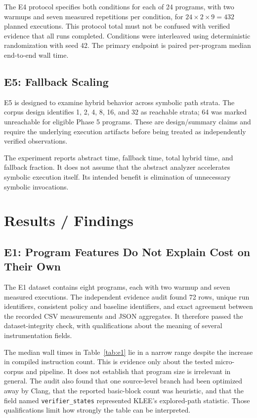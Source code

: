 \documentclass[12pt,a4paper]{article}
\begin{document}
The E4 protocol specifies both conditions for each of 24 programs, with two warmups and seven measured repetitions per condition, for $24\times2\times9=432$ planned executions. This protocol total must not be confused with verified evidence that all runs completed. Conditions were interleaved using deterministic randomization with seed 42. The primary endpoint is paired per-program median end-to-end wall time.

\subsection{E5: Fallback Scaling}

E5 is designed to examine hybrid behavior across symbolic path strata. The corpus design identifies 1, 2, 4, 8, 16, and 32 as reachable strata; 64 was marked unreachable for eligible Phase 5 programs. These are design/summary claims and require the underlying execution artifacts before being treated as independently verified observations.

The experiment reports abstract time, fallback time, total hybrid time, and fallback fraction. It does not assume that the abstract analyzer accelerates symbolic execution itself. Its intended benefit is elimination of unnecessary symbolic invocations.

\section{Results / Findings}

\subsection{E1: Program Features Do Not Explain Cost on Their Own}

The E1 dataset contains eight programs, each with two warmup and seven measured executions. The independent evidence audit found 72 rows, unique run identifiers, consistent policy and baseline identifiers, and exact agreement between the recorded CSV measurements and JSON aggregates. It therefore passed the dataset-integrity check, with qualifications about the meaning of several instrumentation fields.

The median wall times in Table~\ref{tab:e1} lie in a narrow range despite the increase in compiled instruction count. This is evidence only about the tested micro-corpus and pipeline. It does not establish that program size is irrelevant in general. The audit also found that one source-level branch had been optimized away by Clang, that the reported basic-block count was heuristic, and that the field named \texttt{verifier\_states} represented KLEE's explored-path statistic. Those qualifications limit how strongly the table can be interpreted.
\end{document}

